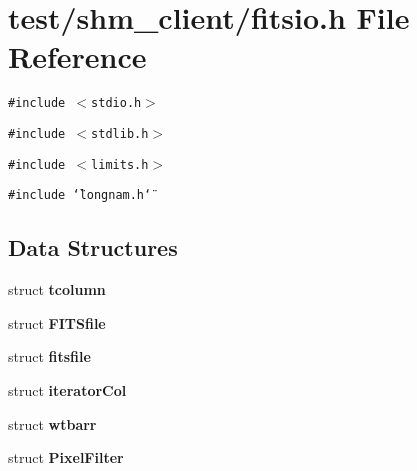 \section{test/shm\_\-client/fitsio.h File Reference}
\label{test_2shm__client_2fitsio_8h}
{\tt \#include $<$stdio.h$>$}\par
{\tt \#include $<$stdlib.h$>$}\par
{\tt \#include $<$limits.h$>$}\par
{\tt \#include \char`\"{}longnam.h\char`\"{}}\par
\subsection*{Data Structures}
\begin{CompactItemize}
\item 
struct \bf{tcolumn}
\item 
struct \bf{FITSfile}
\item 
struct \bf{fitsfile}
\item 
struct \bf{iterator\-Col}
\item 
struct \bf{wtbarr}
\item 
struct \bf{Pixel\-Filter}
\end{CompactItemize}
